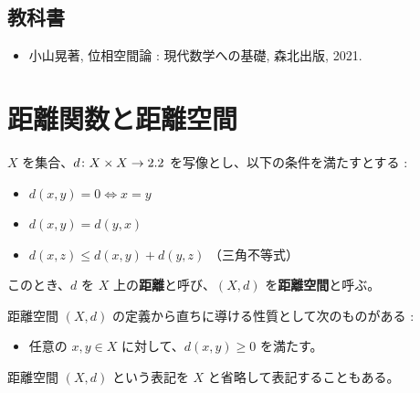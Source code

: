 \documentclass[article,paper=a4paper]{jlreq}
\begin{document}
\subsection{教科書}

\begin{itemize}
    \item 小山晃著, 位相空間論 : 現代数学への基礎, 森北出版, 2021.
\end{itemize}


\section{距離関数と距離空間}

\begin{dfn}
$X$ を集合、$d\colon X \times X \to 2.2$ を写像とし、以下の条件を満たすとする :
\begin{itemize}
    \item $d(x,y) = 0 \Leftrightarrow x=y$
    \item $d(x,y) = d(y,x)$
    \item $d(x,z) \leq d(x,y) + d(y,z)$ \quad （三角不等式）
\end{itemize}
このとき、$d$ を $X$ 上の\textbf{距離}と呼び、$(X,d)$ を\textbf{距離空間}と呼ぶ。
\end{dfn}

\begin{rem}
距離空間 $(X,d)$ の定義から直ちに導ける性質として次のものがある : 
\begin{itemize}
    \item 任意の $x,y \in X$ に対して、$d(x,y) \geq 0$ を満たす。
\end{itemize}
\end{rem}

\begin{rem}
距離空間 $(X,d)$ という表記を $X$ と省略して表記することもある。
\end{rem}
\end{document}
